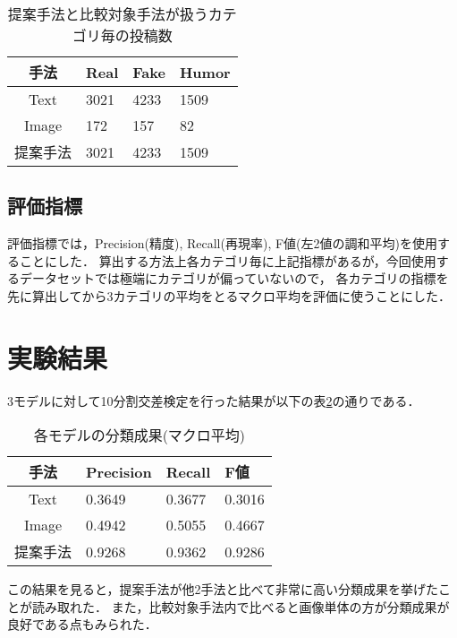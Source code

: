 \begin{table}[h]
    \caption{提案手法と比較対象手法が扱うカテゴリ毎の投稿数}
    \label{table:posts}
    \centering
    \begin{tabular}{clll}
        \hline
        手法 & Real & Fake & Humor \\
        \hline \hline
        Text & 3021 & 4233 & 1509 \\
        Image & 172 & 157 & 82 \\
        提案手法 & 3021 & 4233 & 1509 \\
        \hline
    \end{tabular}
\end{table}

\subsection{評価指標}
評価指標では，Precision(精度), Recall(再現率), F値(左2値の調和平均)を使用することにした．
算出する方法上各カテゴリ毎に上記指標があるが，今回使用するデータセットでは極端にカテゴリが偏っていないので，
各カテゴリの指標を先に算出してから3カテゴリの平均をとるマクロ平均を評価に使うことにした．

\section{実験結果}
3モデルに対して10分割交差検定を行った結果が以下の表\ref{table:result}の通りである．
% 
\begin{table}[h]
    \caption{各モデルの分類成果(マクロ平均)}
    \label{table:result}
    \centering
    \begin{tabular}{clll}
        \hline
        手法 & Precision & Recall & F値 \\
        \hline \hline
        Text & 0.3649 & 0.3677 & 0.3016 \\
        Image & 0.4942 & 0.5055 & 0.4667 \\
        提案手法 & 0.9268 & 0.9362 & 0.9286 \\
        \hline
    \end{tabular}
\end{table}

この結果を見ると，提案手法が他2手法と比べて非常に高い分類成果を挙げたことが読み取れた．
また，比較対象手法内で比べると画像単体の方が分類成果が良好である点もみられた．
